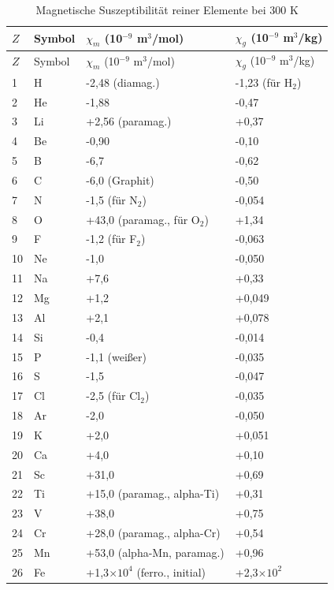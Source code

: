 \documentclass[12pt,a4paper]{article}
\begin{document}
	\begin{longtable}{p{0.6cm}p{1.2cm}p{2.5cm}p{2.5cm}}
		\caption{Magnetische Suszeptibilität reiner Elemente bei 300 K} \label{tab:magnetic-susceptibility-all} \\
		\toprule
		\(Z\) & Symbol & \(\chi_m\) (10\(^{-9}\) m\(^3\)/mol) & \(\chi_g\) (10\(^{-9}\) m\(^3\)/kg) \\
		\midrule
		\endfirsthead
		\toprule
		\(Z\) & Symbol & \(\chi_m\) (10\(^{-9}\) m\(^3\)/mol) & \(\chi_g\) (10\(^{-9}\) m\(^3\)/kg) \\
		\midrule
		\endhead
		1  & H  & -2,48 (diamag.) & -1,23 (für H\(_2\)) \\
		2  & He & -1,88 & -0,47 \\
		3  & Li & +2,56 (paramag.) & +0,37 \\
		4  & Be & -0,90 & -0,10 \\
		5  & B  & -6,7 & -0,62 \\
		6  & C  & -6,0 (Graphit) & -0,50 \\
		7  & N  & -1,5 (für N\(_2\)) & -0,054 \\
		8  & O  & +43,0 (paramag., für O\(_2\)) & +1,34 \\
		9  & F  & -1,2 (für F\(_2\)) & -0,063 \\
		10 & Ne & -1,0 & -0,050 \\
		11 & Na & +7,6 & +0,33 \\
		12 & Mg & +1,2 & +0,049 \\
		13 & Al & +2,1 & +0,078 \\
		14 & Si & -0,4 & -0,014 \\
		15 & P  & -1,1 (weißer) & -0,035 \\
		16 & S  & -1,5 & -0,047 \\
		17 & Cl & -2,5 (für Cl\(_2\)) & -0,035 \\
		18 & Ar & -2,0 & -0,050 \\
		19 & K  & +2,0 & +0,051 \\
		20 & Ca & +4,0 & +0,10 \\
		21 & Sc & +31,0 & +0,69 \\
		22 & Ti & +15,0 (paramag., alpha-Ti) & +0,31 \\
		23 & V  & +38,0 & +0,75 \\
		24 & Cr & +28,0 (paramag., alpha-Cr) & +0,54 \\
		25 & Mn & +53,0 (alpha-Mn, paramag.) & +0,96 \\
		26 & Fe & +1,3\(\times10^4\) (ferro., initial) & +2,3\(\times10^2\) \\

\end{longtable}
\end{document}
